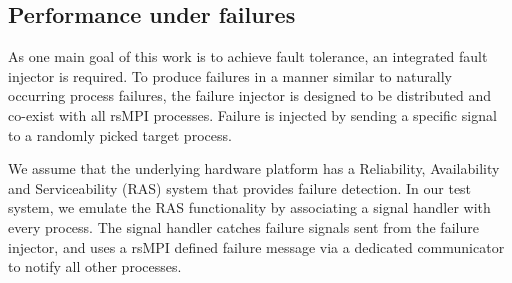 

\subsection{Performance under failures}

As one main goal of this work is to achieve fault tolerance, an integrated fault injector is required. %
To produce failures in a manner similar to naturally occurring process failures, the failure injector is designed to be distributed and co-exist with all rsMPI processes. Failure is injected by sending a specific signal to a randomly picked target process.

We assume that the underlying hardware platform has a Reliability, Availability and Serviceability (RAS) system that provides failure detection. In our test system, we emulate the RAS functionality by associating a signal handler with every process. The signal handler catches failure signals sent from the failure injector, and uses a rsMPI defined failure message via a dedicated communicator to notify all other processes.%

